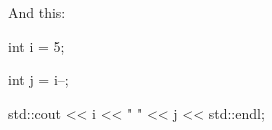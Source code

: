  And this:

\begin{console}

int i = 5;

int j = i--;

std::cout << i << " " << j << std::endl;

\end{console}

